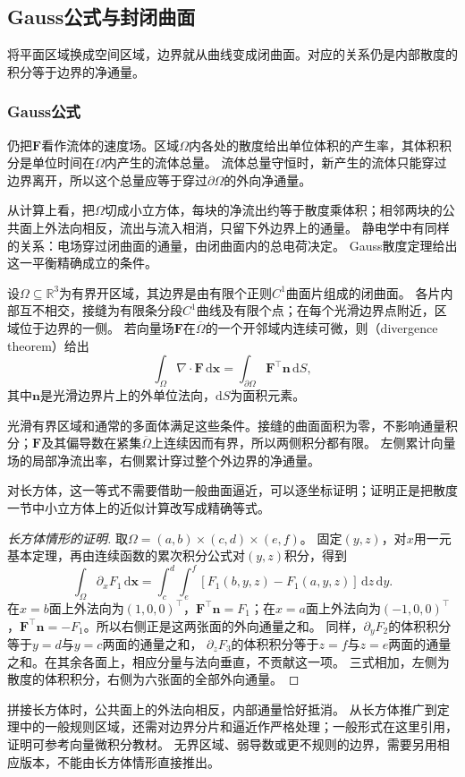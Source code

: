 \subsection{Gauss公式与封闭曲面}

将平面区域换成空间区域，边界就从曲线变成闭曲面。对应的关系仍是内部散度的积分等于边界的净通量。

\subsubsection{Gauss公式}

仍把$\bm F$看作流体的速度场。区域$\Omega$内各处的散度给出单位体积的产生率，其体积积分是单位时间在$\Omega$内产生的流体总量。
流体总量守恒时，新产生的流体只能穿过边界离开，所以这个总量应等于穿过$\partial\Omega$的外向净通量。

从计算上看，把$\Omega$切成小立方体，每块的净流出约等于散度乘体积；相邻两块的公共面上外法向相反，流出与流入相消，只留下外边界上的通量。
静电学中有同样的关系：电场穿过闭曲面的通量，由闭曲面内的总电荷决定。
Gauss散度定理给出这一平衡精确成立的条件。
\begin{theorem}[Gauss散度定理]
\label{thm:analysis-divergence-theorem}
设$\Omega\subseteq\mathbb R^3$为有界开区域，其边界是由有限个正则$C^1$曲面片组成的闭曲面。
各片内部互不相交，接缝为有限条分段$C^1$曲线及有限个点；在每个光滑边界点附近，区域位于边界的一侧。
若向量场$\bm F$在$\overline\Omega$的一个开邻域内连续可微，则（divergence theorem）给出
\begin{equation}
  \int_{\Omega}\nabla\mathbin{\cdot}\bm F\,\mathrm d\bm x
  =\int_{\partial\Omega}\bm F^\top\bm n\,\mathrm dS,
 \label{eq:analysis-divergence-theorem}
\end{equation}
其中$\bm n$是光滑边界片上的外单位法向，$\mathrm dS$为面积元素。
\end{theorem}
光滑有界区域和通常的多面体满足这些条件。接缝的曲面面积为零，不影响通量积分；$\bm F$及其偏导数在紧集$\overline\Omega$上连续因而有界，所以两侧积分都有限。
左侧累计向量场的局部净流出率，右侧累计穿过整个外边界的净通量。

对长方体，这一等式不需要借助一般曲面逼近，可以逐坐标证明；证明正是把散度一节中小立方体上的近似计算改写成精确等式。
\begin{proof}[长方体情形的证明]
取$\Omega=(a,b)\times(c,d)\times(e,f)$。
固定$(y,z)$，对$x$用一元基本定理，再由连续函数的累次积分公式对$(y,z)$积分，得到
\[
 \int_\Omega\partial_xF_1\,\mathrm d\bm x
 =\int_c^d\int_e^f
   [F_1(b,y,z)-F_1(a,y,z)]\,\mathrm dz\,\mathrm dy.
\]
在$x=b$面上外法向为$(1,0,0)^\top$，$\bm F^\top\bm n=F_1$；在$x=a$面上外法向为$(-1,0,0)^\top$，$\bm F^\top\bm n=-F_1$。所以右侧正是这两张面的外向通量之和。
同样，$\partial_yF_2$的体积积分等于$y=d$与$y=c$两面的通量之和，
$\partial_zF_3$的体积积分等于$z=f$与$z=e$两面的通量之和。在其余各面上，相应分量与法向垂直，不贡献这一项。
三式相加，左侧为散度的体积积分，右侧为六张面的全部外向通量。
\end{proof}
拼接长方体时，公共面上的外法向相反，内部通量恰好抵消。
从长方体推广到定理中的一般规则区域，还需对边界分片和逼近作严格处理；一般形式在这里引用，证明可参考向量微积分教材。
无界区域、弱导数或更不规则的边界，需要另用相应版本，不能由长方体情形直接推出。


